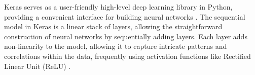 Keras serves as a user-friendly high-level deep learning library in Python, providing a convenient interface for building neural networks \citep{gulli_deep_2017}. The sequential model in Keras is a linear stack of layers, allowing the straightforward construction of neural networks by sequentially adding layers. Each layer adds non-linearity to the model, allowing it to capture intricate patterns and correlations within the data, frequently using activation functions like Rectified Linear Unit (ReLU) \citep{gulli_deep_2017}. 

